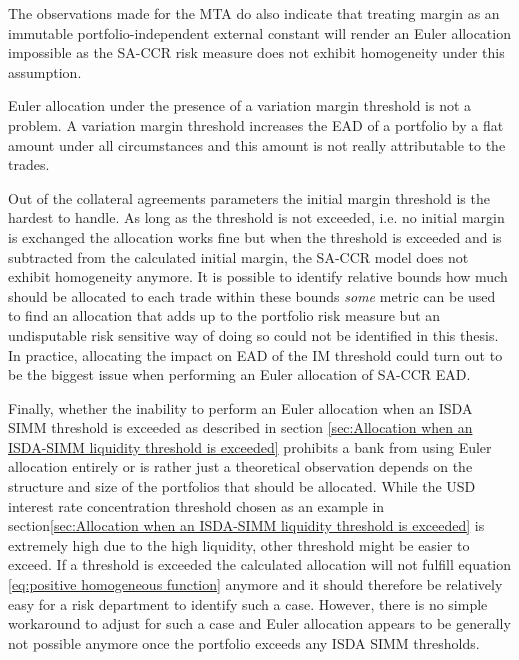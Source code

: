 \documentclass[../Thesis_AHoecherl.tex]{subfiles}
\begin{document}
    The observations made for the \gls{MTA} do also indicate that treating margin as an immutable portfolio-independent external constant will render an Euler allocation impossible as the \gls{SA-CCR} risk measure does not exhibit homogeneity under this assumption.

    Euler allocation under the presence of a variation margin threshold is not a problem.
    A variation margin threshold increases the \gls{EAD} of a portfolio by a flat amount under all circumstances and this amount is not really attributable to the trades.

    Out of the collateral agreements parameters the initial margin threshold is the hardest to handle. As long as the threshold is not exceeded, i.e. no initial margin is exchanged the allocation works fine but when the threshold is exceeded and is subtracted from the calculated initial margin, the \gls{SA-CCR} model does not exhibit homogeneity anymore.
    It is possible to identify relative bounds how much should be allocated to each trade within these bounds \emph{some} metric can be used to find an allocation that adds up to the portfolio risk measure but an undisputable risk sensitive way of doing so could not be identified in this thesis.
    In practice, allocating the impact on \gls{EAD} of the \gls{IM} threshold could turn out to be the biggest issue when performing an Euler allocation of \gls{SA-CCR} EAD.

    Finally, whether the inability to perform an Euler allocation when an \gls{ISDA SIMM} threshold is exceeded as described in section \ref{sec:Allocation when an ISDA-SIMM liquidity threshold is exceeded} prohibits a bank from using Euler allocation entirely or is rather just a theoretical observation depends on the structure and size of the portfolios that should be allocated.
    While the USD interest rate concentration threshold chosen as an example in section\ref{sec:Allocation when an ISDA-SIMM liquidity threshold is exceeded} is extremely high due to the high liquidity, other threshold might be easier to exceed. If a threshold is exceeded the calculated allocation will not fulfill equation \ref{eq:positive homogeneous function} anymore and it should therefore be relatively easy for a risk department to identify such a case. However, there is no simple workaround to adjust for such a case and Euler allocation appears to be generally not possible anymore once the portfolio exceeds any \gls{ISDA SIMM} thresholds.
\end{document}
